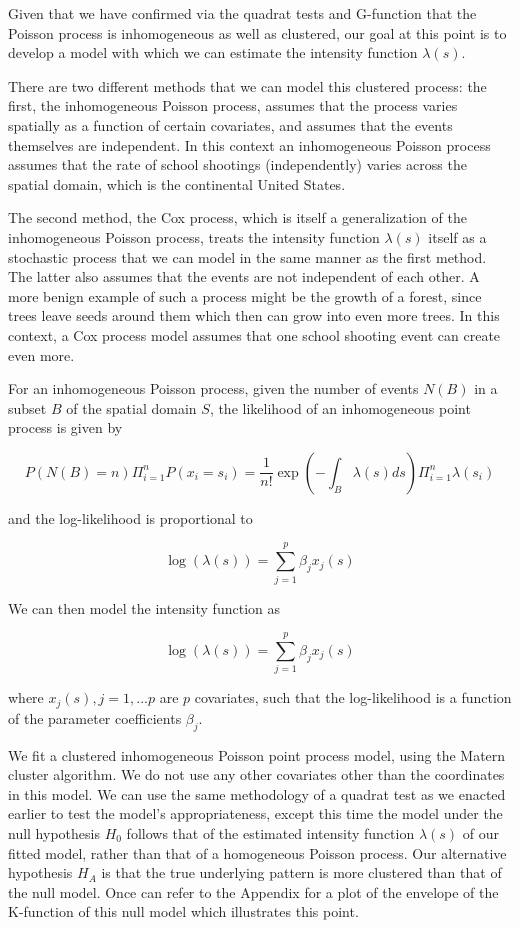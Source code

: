 \documentclass[
  12pt,
]{article}
\begin{document}
Given that we have confirmed via the quadrat tests and G-function that
the Poisson process is inhomogeneous as well as clustered, our goal at
this point is to develop a model with which we can estimate the
intensity function \(\lambda(s)\).

There are two different methods that we can model this clustered
process: the first, the inhomogeneous Poisson process, assumes that the
process varies spatially as a function of certain covariates, and
assumes that the events themselves are independent. In this context an
inhomogeneous Poisson process assumes that the rate of school shootings
(independently) varies across the spatial domain, which is the
continental United States.

The second method, the Cox process, which is itself a generalization of
the inhomogeneous Poisson process, treats the intensity function
\(\lambda(s)\) itself as a stochastic process that we can model in the
same manner as the first method. The latter also assumes that the events
are not independent of each other. A more benign example of such a
process might be the growth of a forest, since trees leave seeds around
them which then can grow into even more trees. In this context, a Cox
process model assumes that one school shooting event can create even
more.

For an inhomogeneous Poisson process, given the number of events
\(N(B)\) in a subset \(B\) of the spatial domain \(S\), the likelihood
of an inhomogeneous point process is given by

\[P(N(B) = n) \Pi^n_{i=1} P(x_i = s_i) = \frac{1}{n!} \exp(- \int_B \lambda(s) ds) \Pi^n_{i=1} \lambda(s_i)\]

and the log-likelihood is proportional to

\[\log(\lambda(s))= \sum_{j=1}^p \beta_j x_j(s)\]

We can then model the intensity function as

\[\log (\lambda(s)) = \sum_{j=1}^p \beta_j x_j(s)\]

where \(x_j(s), j = 1,...p\) are \(p\) covariates, such that the
log-likelihood is a function of the parameter coefficients \(\beta_j\).

We fit a clustered inhomogeneous Poisson point process model, using the
Matern cluster algorithm. We do not use any other covariates other than
the coordinates in this model. We can use the same methodology of a
quadrat test as we enacted earlier to test the model's appropriateness,
except this time the model under the null hypothesis \(H_0\) follows
that of the estimated intensity function \(\lambda(s)\) of our fitted
model, rather than that of a homogeneous Poisson process. Our
alternative hypothesis \(H_A\) is that the true underlying pattern is
more clustered than that of the null model. Once can refer to the
Appendix for a plot of the envelope of the K-function of this null model
which illustrates this point.
\end{document}
